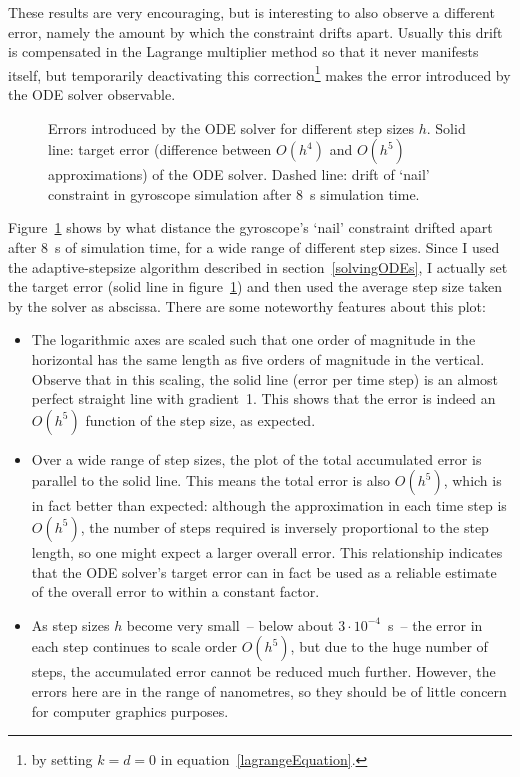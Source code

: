 These results are very encouraging, but is interesting to also observe a different error, namely
the amount by which the constraint drifts apart. Usually this drift is compensated in the Lagrange
multiplier method so that it never manifests itself, but temporarily deactivating this
correction\footnote{by setting $k=d=0$ in equation~\ref{lagrangeEquation}.} makes the error
introduced by the ODE solver observable.

\begin{figure}
\centerline{}
\caption{Errors introduced by the ODE solver for different step sizes $h$.
    Solid line: target error (difference between $O(h^4)$ and $O(h^5)$ approximations) of
    the ODE solver. Dashed line: drift of `nail' constraint in gyroscope simulation after
    8~s simulation time.\label{errorplot}}
\end{figure}

Figure~\ref{errorplot} shows by what distance the gyroscope's `nail' constraint drifted apart
after 8~s of simulation time, for a wide range of different step sizes. Since I used the
adaptive-stepsize algorithm described in section~\ref{solvingODEs}, I actually set the target
error (solid line in figure~\ref{errorplot}) and then used the average step size taken by the
solver as abscissa. There are some noteworthy features about this plot:

\begin{itemize}
\item The logarithmic axes are scaled such that one order of magnitude in the horizontal has the
    same length as five orders of magnitude in the vertical. Observe that in this scaling, the
    solid line (error per time step) is an almost perfect straight line with gradient~1. This
    shows that the error is indeed an $O(h^5)$ function of the step size, as expected.
\item Over a wide range of step sizes, the plot of the total accumulated error is parallel to the
    solid line. This means the total error is also $O(h^5)$, which is in fact better than
    expected: although the approximation in each time step is $O(h^5)$, the number of steps
    required is inversely proportional to the step length, so one might expect a larger overall
    error. This relationship indicates that the ODE solver's target error can in fact be used
    as a reliable estimate of the overall error to within a constant factor.
\item As step sizes $h$ become very small~-- below about $3\cdot 10^{-4}$~s~-- the error in each
    step continues to scale order $O(h^5)$, but due to the huge number of steps, the accumulated
    error cannot be reduced much further. However, the errors here are in the range of nanometres,
    so they should be of little concern for computer graphics purposes.
\end{itemize}

